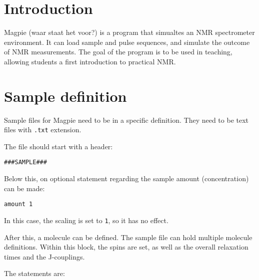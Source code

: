 \documentclass[11pt,a4paper]{article}
\renewcommand\cfttoctitlefont{\color{black!70}\Huge\fontfamily{SourceSansPro-LF}\bfseries}
\begin{document}


\thispagestyle{empty}
\newpage
\mbox{}


\renewcommand\cfttoctitlefont{\color{black}\Huge\fontfamily{SourceSansPro-LF}\bfseries}
\setcounter{tocdepth}{2}
\tableofcontents %

\renewcommand\cfttoctitlefont{\color{black!70}\Huge\fontfamily{SourceSansPro-LF}\bfseries}


\section{Introduction}
Magpie (waar staat het voor?) is a program that simualtes an NMR spectrometer environment. It can load sample and pulse sequences, and simulate the outcome of NMR measurements. The goal of the program is to be used in teaching, allowing students a first introduction to practical NMR.

\section{Sample definition}
Sample files for Magpie need to be in a specific definition. They need to be text files with \texttt{.txt} extension.

The file should start with a header:
\begin{verbatim}
###SAMPLE###
\end{verbatim}
Below this, on optional statement regarding the sample amount (concentration) can be made:

\begin{verbatim}
amount 1 
\end{verbatim}
In this case, the scaling is set to \texttt{1}, so it has no effect.

After this, a molecule can be defined. The sample file can hold multiple molecule definitions. Within this block, the spins are set, as well as the overall relaxation times and the J-couplings.

The statements are:
\end{document}
